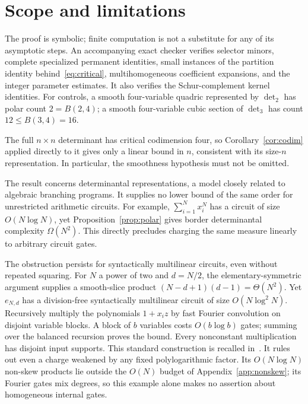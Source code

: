 \documentclass[11pt]{article}
\theoremstyle{remark}\newtheorem{remark}[theorem]{Remark}
\begin{document}
\section{Scope and limitations}

The proof is symbolic; finite computation is not a substitute for
any of its asymptotic steps. An accompanying exact checker verifies
selector minors, complete specialized permanent identities, small
instances of the partition identity behind~\eqref{eq:critical},
multihomogeneous coefficient expansions, and the integer parameter
estimates. It also verifies the Schur-complement kernel identities.
For controls, a smooth four-variable quadric represented by $\det_2$
has polar count $2=B(2,4)$; a smooth four-variable cubic section of
$\det_3$ has count $12\le B(3,4)=16$.

The full $n\times n$ determinant has critical codimension four, so
Corollary~\ref{cor:codim} applied directly to it gives only a linear
bound in $n$, consistent with its size-$n$ representation. In
particular, the smoothness hypothesis must not be omitted.

The result concerns determinantal representations, a model closely
related to algebraic branching programs. It supplies no lower bound
of the same order for unrestricted arithmetic circuits. For example,
$\sum_{i=1}^N x_i^N$ has a circuit of size $O(N\log N)$, yet
Proposition~\ref{prop:polar} gives border determinantal complexity
$\Omega(N^2)$. This directly precludes charging the same measure
linearly to arbitrary circuit gates.

The obstruction persists for syntactically multilinear circuits, even
without repeated squaring. For $N$ a power of two and $d=N/2$,
the elementary-symmetric argument supplies a smooth-slice product
$(N-d+1)(d-1)=\Theta(N^2)$. Yet $e_{N,d}$ has a division-free
syntactically multilinear circuit of size $O(N\log^2 N)$. Recursively
multiply the polynomials $1+x_i z$ by fast Fourier convolution on
disjoint variable blocks. A block of $b$ variables costs $O(b\log b)$
gates; summing over the balanced recursion proves the bound. Every
nonconstant multiplication has disjoint input supports. This standard
construction is recalled in~\cite[Section 5]{Shastri}. It rules out
even a charge weakened by any fixed polylogarithmic factor. Its
$O(N\log N)$ non-skew products lie outside the $O(N)$ budget of
Appendix~\ref{app:nonskew}; its Fourier gates mix degrees, so this
example alone makes no assertion about homogeneous internal gates.
\end{document}
